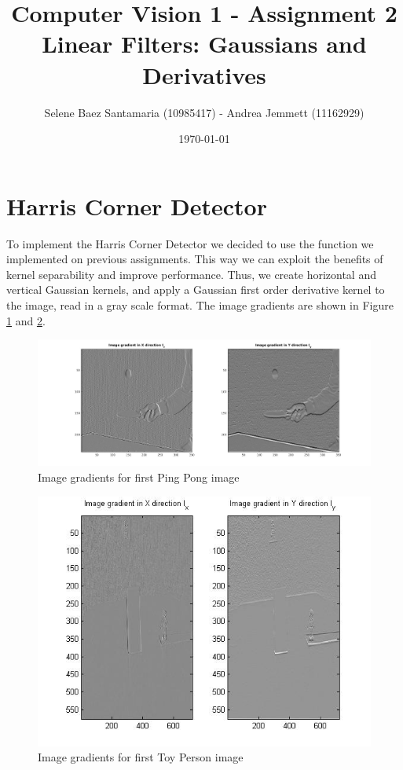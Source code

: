 \documentclass[11pt]{article}
\title{
	{Computer Vision 1 - Assignment 2 \\
	Linear Filters: Gaussians and Derivatives}
}
\author{
Selene Baez Santamaria (10985417) - Andrea Jemmett (11162929)}
\date{\today}
\begin{document}
\maketitle

\section{Harris Corner Detector}
To implement the Harris Corner Detector we decided to use the function we implemented on previous assignments. This way we can exploit the benefits of kernel separability and improve performance. Thus, we create horizontal and vertical Gaussian kernels, and apply a Gaussian first order derivative kernel to the image, read in a gray scale format. The image gradients are shown in Figure \ref{fig:partialDerivatives_pingpong} and \ref{fig:partialDerivatives_person}.

\begin{figure}[H] \centering
	\includegraphics[width=1\textwidth]{imgs/derivatives_pingpong.jpg}
	\caption{Image gradients for first Ping Pong image}
	\label{fig:partialDerivatives_pingpong}
\end{figure}

\begin{figure}[H] \centering
	\includegraphics[width=1\textwidth]{imgs/derivatives_person.jpg}
	\caption{Image gradients for first Toy Person image}
	\label{fig:partialDerivatives_person}
\end{figure}
\end{document}
